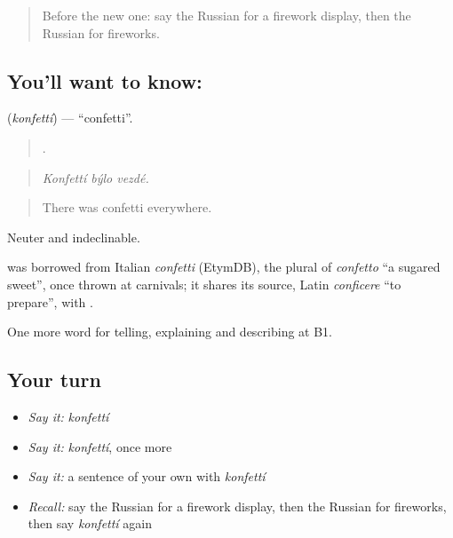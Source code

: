 \label{lesson:RU-C314-konfetti}



\begin{quote}
Before the new one: say the Russian for a firework display, then the Russian for fireworks.
\end{quote}

\subsection*{You'll want to know: }
\textbf{} (\emph{konfettí}) — \textquotedblleft{}confetti\textquotedblright{}.

\begin{quote}
  .
\end{quote}

\begin{quote}
\emph{Konfettí býlo vezdé.}
\end{quote}

\begin{quote}
There was confetti everywhere.
\end{quote}

Neuter and indeclinable.

\begin{cousinweb}
\emph{} was borrowed from Italian \emph{confetti} (EtymDB), the plural of \emph{confetto} \textquotedblleft{}a sugared sweet\textquotedblright{}, once thrown at carnivals; it shares its source, Latin \emph{conficere} \textquotedblleft{}to prepare\textquotedblright{}, with \emph{}.
\end{cousinweb}

\begin{grammarlens}[title={What you've built}]
One more word for telling, explaining and describing at B1.
\end{grammarlens}

\subsection*{Your turn}
\begin{itemize}
\raggedright
  \item \emph{Say it:} \emph{konfettí}
  \item \emph{Say it:} \emph{konfettí}, once more
  \item \emph{Say it:} a sentence of your own with \emph{konfettí}
  \item \emph{Recall:} say the Russian for a firework display, then the Russian for fireworks, then say \emph{konfettí} again
\end{itemize}

